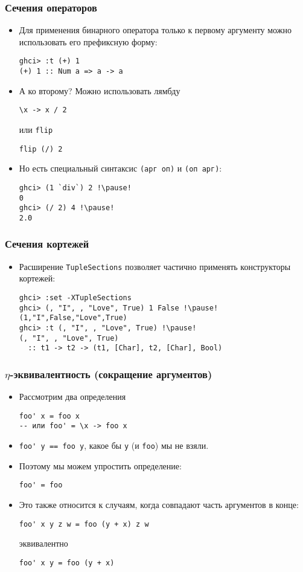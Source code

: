 \documentclass[10pt]{beamer}
\begin{document}
\begin{frame}[fragile]
\frametitle{Сечения операторов}
\begin{itemize}
    \item Для применения бинарного оператора только к первому аргументу можно использовать его префиксную форму:
\begin{lstlisting}
ghci> :t (+) 1
(+) 1 :: Num a => a -> a
\end{lstlisting}\pause
    \item А ко второму? Можно использовать лямбду
\begin{lstlisting}
\x -> x / 2
\end{lstlisting}
или \lstinline|flip|
\begin{lstlisting}
flip (/) 2
\end{lstlisting}\pause
    \item Но есть специальный синтаксис \lstinline|(арг оп)| и \lstinline|(оп арг)|:
\begin{lstlisting}
ghci> (1 `div`) 2 !\pause!
0
ghci> (/ 2) 4 !\pause!
2.0
\end{lstlisting}
\end{itemize}
\end{frame}

\begin{frame}[fragile]
\frametitle{Сечения кортежей}
\begin{itemize}
    \item Расширение \lstinline|TupleSections| позволяет частично применять конструкторы кортежей:
\begin{lstlisting}
ghci> :set -XTupleSections
ghci> (, "I", , "Love", True) 1 False !\pause!
(1,"I",False,"Love",True)
ghci> :t (, "I", , "Love", True) !\pause!
(, "I", , "Love", True)
  :: t1 -> t2 -> (t1, [Char], t2, [Char], Bool)
\end{lstlisting}
\end{itemize}
\end{frame}

\begin{frame}[fragile]
\frametitle{$\eta$-эквивалентность (сокращение аргументов)}
\begin{itemize}
    \item Рассмотрим два определения
\begin{lstlisting}
foo' x = foo x
-- или foo' = \x -> foo x 
\end{lstlisting}
    \item \lstinline|foo' y == foo y|, какое бы \lstinline|y| (и \lstinline|foo|) мы не взяли.\pause
    \item Поэтому мы можем упростить определение:
\begin{lstlisting}
foo' = foo
\end{lstlisting}\pause
    \item Это также относится к случаям, когда совпадают часть аргументов в конце:
\begin{lstlisting}
foo' x y z w = foo (y + x) z w
\end{lstlisting}
эквивалентно
\begin{lstlisting}
foo' x y = foo (y + x)
\end{lstlisting}
\end{itemize}
\end{frame}
\end{document}
